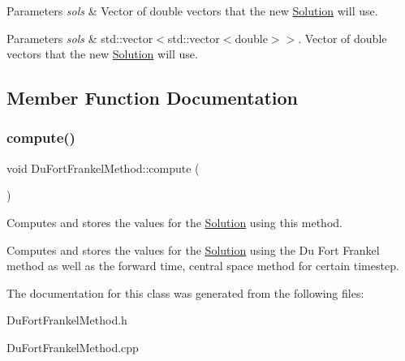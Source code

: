 \begin{DoxyParams}{Parameters}
{\em sols} & Vector of double vectors that the new \hyperlink{class_solution}{Solution} will use. \\
\hline
\end{DoxyParams}

\begin{DoxyParams}{Parameters}
{\em sols} & std\+::vector$<$std\+::vector$<$double$>$$>$. Vector of double vectors that the new \hyperlink{class_solution}{Solution} will use. \\
\hline
\end{DoxyParams}


\subsection{Member Function Documentation}
\mbox{\label{class_du_fort_frankel_method_a68b9ad88883a71daba4c2fc92355b173}} 
\subsubsection{\texorpdfstring{compute()}{compute()}}
{\footnotesize\ttfamily void Du\+Fort\+Frankel\+Method\+::compute (\begin{DoxyParamCaption}{ }\end{DoxyParamCaption})}

Computes and stores the values for the \hyperlink{class_solution}{Solution} using this method.

Computes and stores the values for the \hyperlink{class_solution}{Solution} using the Du Fort Frankel method as well as the forward time, central space method for certain timestep. 

The documentation for this class was generated from the following files\+:\begin{DoxyCompactItemize}
\item 
Du\+Fort\+Frankel\+Method.\+h\item 
Du\+Fort\+Frankel\+Method.\+cpp\end{DoxyCompactItemize}

